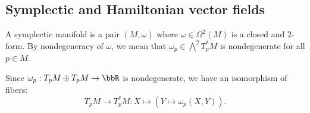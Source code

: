 \subsection{Symplectic and Hamiltonian vector fields}
\begin{dang}
    \begin{definition}
        A symplectic manifold is a pair $(M,\omega)$ where $\omega\in\Omega^2(M)$ is a closed and 
         2-form. By nondegeneracy of $\omega$, we mean that $\omega_p\in\bigwedge^2T_p^*M$ is nondegenerate 
        for all $p\in M$.
    \end{definition}
\end{dang}
Since $\omega_p:T_pM\oplus T_pM\to\bbR$ is nondegenerate, we have an isomorphism of fibers:
\begin{equation}
    T_pM\to T_p^*M: X\mapsto (Y\mapsto \omega_p(X,Y)).
\end{equation}

